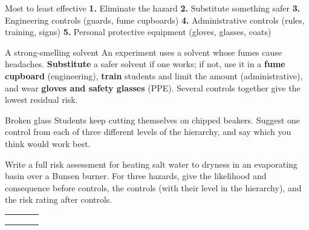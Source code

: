 \begin{skillbox}{Most to least effective}
\textbf{1.} Eliminate the hazard \quad \textbf{2.} Substitute something safer \quad \textbf{3.} Engineering controls (guards, fume cupboards) \quad \textbf{4.} Administrative controls (rules, training, signs) \quad \textbf{5.} Personal protective equipment (gloves, glasses, coats)
\end{skillbox}

\begin{workedex}{A strong-smelling solvent}
An experiment uses a solvent whose fumes cause headaches. \textbf{Substitute} a safer solvent if one works; if not, use it in a \textbf{fume cupboard} (engineering), \textbf{train} students and limit the amount (administrative), and wear \textbf{gloves and safety glasses} (PPE). Several controls together give the lowest residual risk.
\end{workedex}

\begin{wedo}{Broken glass}
Students keep cutting themselves on chipped beakers. Suggest one control from each of three different levels of the hierarchy, and say which you think would work best.
\answerbox{5cm}
\end{wedo}

\label{prac:3}


\label{ext:3}

\task Write a full risk assessment for heating salt water to dryness in an evaporating basin over a Bunsen burner. For three hazards, give the likelihood and consequence before controls, the controls (with their level in the hierarchy), and the risk rating after controls.
\begin{ctab}
\begin{tabular}{|W{2.0cm}|C{1.3cm}|W{3.6cm}|C{1.3cm}|}
  \hline{} &  &  &  \\ \hline
  & & & \\[12mm] \hline
  & & & \\[12mm] \hline
  & & & \\[12mm] \hline
\end{tabular}
\end{ctab}

\clearpage
